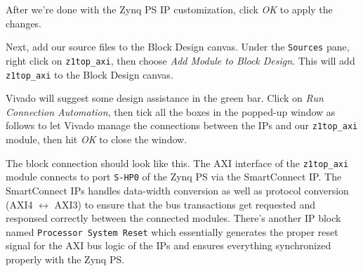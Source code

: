 \documentclass[11pt]{article}
\begin{document}
After we're done with the Zynq PS IP customization, click \emph{OK} to apply the changes.

Next, add our source files to the Block Design canvas. Under the \texttt{Sources} pane, right click on \texttt{z1top\_axi}, then choose \emph{Add Module to Block Design}. This will add \verb|z1top_axi| to the Block Design canvas.

\begin{center}
\end{center}

Vivado will suggest some design assistance in the green bar. Click on \emph{Run Connection Automation}, then tick all the boxes in the popped-up window as follows to let Vivado manage the connections between the IPs and our \verb|z1top_axi| module, then hit \emph{OK} to close the window.

\begin{center}
\end{center}

The block connection should look like this. The AXI interface of the \verb|z1top_axi| module connects to port \texttt{S-HP0} of the Zynq PS via the SmartConnect IP. The SmartConnect IPs handles data-width conversion as well as protocol conversion (AXI4 $\leftrightarrow$ AXI3) to ensure that the bus transactions get requested and responsed correctly between the connected modules. There's another IP block named \texttt{Processor System Reset} which essentially generates the proper reset signal for the AXI bus logic of the IPs and ensures everything synchronized properly with the Zynq PS.
\end{document}
